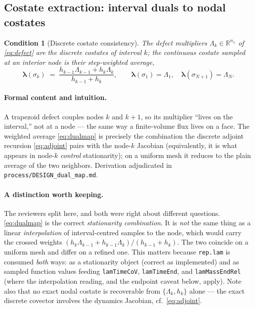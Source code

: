 \documentclass[11pt]{article}
\newcommand{\vlam}{\boldsymbol{\lambda}}
\newcommand{\file}[1]{\texttt{#1}}
\newcommand{\code}[1]{\texttt{#1}}
\newtheorem{condition}{Condition}
\begin{document}
\subsection{Costate extraction: interval duals to nodal costates}
\label{sec:costates}

\begin{condition}[Discrete costate consistency]
The defect multipliers $\Lambda_k\in\mathbb R^{n_x}$ of \eqref{eq:defect} are
the discrete costates of interval $k$; the continuous costate sampled at an
interior node is their step-weighted average,
\begin{equation}
\vlam(\sigma_k) \;=\;
\frac{h_{k-1}\Lambda_{k-1} + h_k \Lambda_k}{h_{k-1}+h_k},
\qquad
\vlam(\sigma_1)=\Lambda_1,\quad \vlam(\sigma_{N+1})=\Lambda_N .
\label{eq:dualmap}
\end{equation}
\end{condition}

\paragraph{Formal content and intuition.}
A trapezoid defect couples nodes $k$ and $k{+}1$, so its multiplier ``lives on
the interval,'' not at a node --- the same way a finite-volume flux lives on a
face. The weighted average \eqref{eq:dualmap} is precisely the combination the
discrete adjoint recursion \eqref{eq:adjoint} pairs with the node-$k$ Jacobian
(equivalently, it is what appears in node-$k$ \emph{control} stationarity);
on a uniform mesh it reduces to the plain average of the two neighbors.
Derivation adjudicated in \file{process/DESIGN\_dual\_map.md}.

\paragraph{A distinction worth keeping.}
The reviewers split here, and both were right about different questions.
\eqref{eq:dualmap} is the correct \emph{stationarity combination}. It is
\emph{not} the same thing as a linear \emph{interpolation} of interval-centred
samples to the node, which would carry the crossed weights
$(h_k\Lambda_{k-1}+h_{k-1}\Lambda_k)/(h_{k-1}+h_k)$. The two coincide on a
uniform mesh and differ on a refined one. This matters because
\code{rep.lam} is consumed \emph{both} ways: as a stationarity object (correct
as implemented) and as sampled function values feeding
\code{lamTimeCoV}, \code{lamTimeEnd}, and \code{lamMassEndRel} (where the
interpolation reading, and the endpoint caveat below, apply). Note also that no
exact nodal costate is recoverable from $\{\Lambda_k,h_k\}$ alone --- the exact
discrete covector involves the dynamics Jacobian, cf.\ \eqref{eq:adjoint}.
\end{document}
